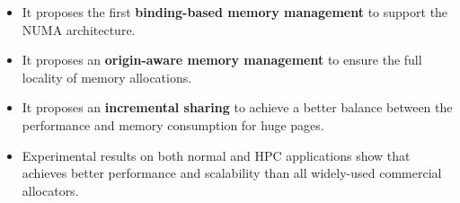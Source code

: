 

\begin{itemize}

\item It proposes the first \textbf{binding-based memory management} to support the NUMA architecture.

\item It proposes an \textbf{origin-aware memory management} to ensure the full locality of memory allocations. 

\item It proposes an \textbf{incremental sharing} to achieve a better balance between the performance and memory consumption for huge pages. 



\item Experimental results on both normal and HPC applications show that \NM{} achieves better performance and scalability than all widely-used commercial allocators. 




\end{itemize}

